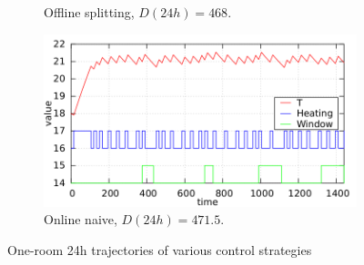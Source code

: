\begin{figure}[!htb]
\begin{subfigure}{0.51\textwidth}
            \caption{Offline splitting, $D(24h)=468$.} \label{fig:2c}
        \end{subfigure}%
        \hspace*{\fill} 
        \begin{subfigure}{0.51\textwidth}
            \includegraphics[width=\linewidth]{images/2_d.png}
            \caption{Online naive, $D(24h)=471.5$.} \label{fig:2d}
        \end{subfigure}%
        \caption{One-room 24h trajectories of various control strategies}
    \end{figure}

